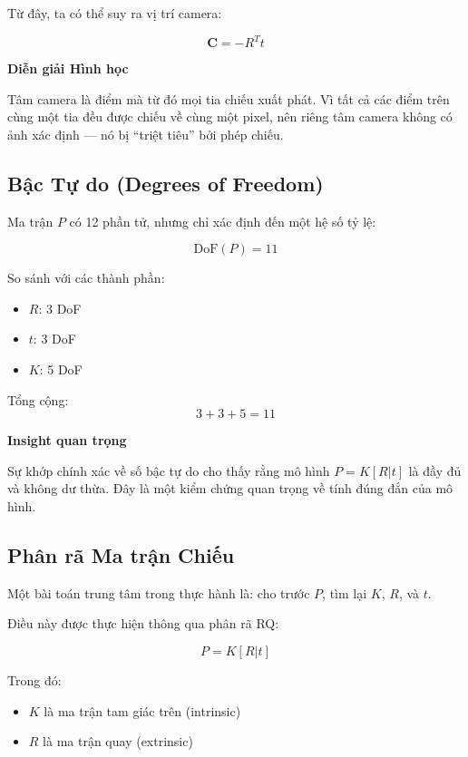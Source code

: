 Từ đây, ta có thể suy ra vị trí camera:

\[
\mathbf{C} = -R^T t
\]

\begin{mdframed}[style=infobox]
	\textbf{Diễn giải Hình học}
	
	Tâm camera là điểm mà từ đó mọi tia chiếu xuất phát. Vì tất cả các điểm trên cùng một tia đều được chiếu về cùng một pixel, nên riêng tâm camera không có ảnh xác định — nó bị “triệt tiêu” bởi phép chiếu.
\end{mdframed}

\subsection{Bậc Tự do (Degrees of Freedom)}
\label{subsec:projection_dof}

Ma trận $P$ có 12 phần tử, nhưng chỉ xác định đến một hệ số tỷ lệ:

\[
\text{DoF}(P) = 11
\]

So sánh với các thành phần:
\begin{itemize}
	\item $R$: 3 DoF
	\item $t$: 3 DoF
	\item $K$: 5 DoF
\end{itemize}

Tổng cộng:
\[
3 + 3 + 5 = 11
\]

\begin{mdframed}[style=infobox]
	\textbf{Insight quan trọng}
	
	Sự khớp chính xác về số bậc tự do cho thấy rằng mô hình $P = K[R|t]$ là đầy đủ và không dư thừa. Đây là một kiểm chứng quan trọng về tính đúng đắn của mô hình.
\end{mdframed}

\subsection{Phân rã Ma trận Chiếu}
\label{subsec:projection_decomposition}

Một bài toán trung tâm trong thực hành là: cho trước $P$, tìm lại $K$, $R$, và $t$.

Điều này được thực hiện thông qua phân rã RQ:

\[
P = K [R | t]
\]

Trong đó:
\begin{itemize}
	\item $K$ là ma trận tam giác trên (intrinsic)
	\item $R$ là ma trận quay (extrinsic)
\end{itemize}

